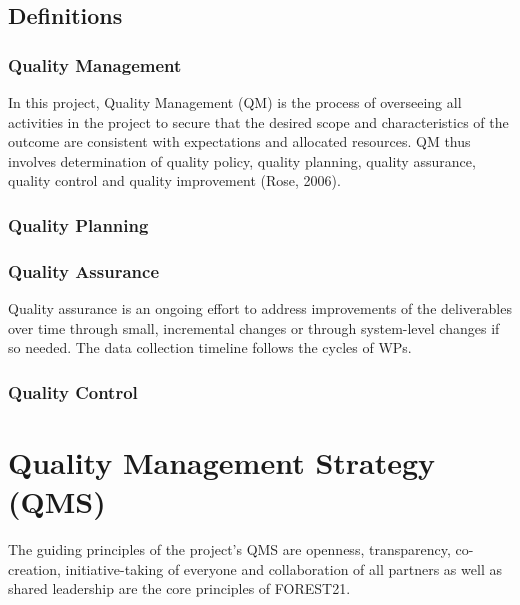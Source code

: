 \documentclass[
  11pt,
]{article}
\begin{document}
\hypertarget{definitions}{%
\subsection{Definitions}\label{definitions}}

\hypertarget{quality-management}{%
\subsubsection{Quality Management}\label{quality-management}}

In this project, Quality Management (QM) is the process of overseeing
all activities in the project to secure that the desired scope and
characteristics of the outcome are consistent with expectations and
allocated resources. QM thus involves determination of quality policy,
quality planning, quality assurance, quality control and quality
improvement (Rose, 2006).

\hypertarget{quality-planning}{%
\subsubsection{Quality Planning}\label{quality-planning}}

\hypertarget{quality-assurance}{%
\subsubsection{Quality Assurance}\label{quality-assurance}}

Quality assurance is an ongoing effort to address improvements of the
deliverables over time through small, incremental changes or through
system-level changes if so needed. The data collection timeline follows
the cycles of WPs.

\hypertarget{quality-control}{%
\subsubsection{Quality Control}\label{quality-control}}

\clearpage

\hypertarget{quality-management-strategy-qms}{%
\section{Quality Management Strategy
(QMS)}\label{quality-management-strategy-qms}}

The guiding principles of the project's QMS are openness, transparency,
co-creation, initiative-taking of everyone and collaboration of all
partners as well as shared leadership are the core principles of
FOREST21.
\end{document}
